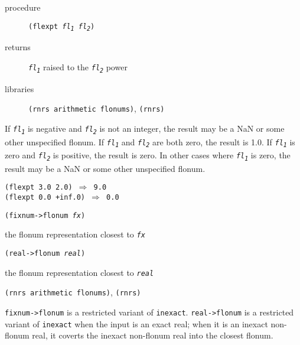 \begin{description}

\label{objects_s197}\item[procedure] \texttt{(flexpt \textit{fl\textsubscript{1}} \textit{fl\textsubscript{2}})}



\item[returns] \texttt{\textit{fl\textsubscript{1}}} raised to the \texttt{\textit{fl\textsubscript{2}}} power


\item[libraries] \texttt{(rnrs arithmetic flonums)}, \texttt{(rnrs)}
\end{description}


If \texttt{\textit{fl\textsubscript{1}}} is negative and \texttt{\textit{fl\textsubscript{2}}} is not an integer,
the result may be a NaN or some other unspecified flonum.
If \texttt{\textit{fl\textsubscript{1}}} and \texttt{\textit{fl\textsubscript{2}}} are both zero, the result
is 1.0.  If \texttt{\textit{fl\textsubscript{1}}} is zero and \texttt{\textit{fl\textsubscript{2}}} is positive,
the result is zero.  In other cases where \texttt{\textit{fl\textsubscript{1}}} is
zero, the result may be a NaN or some other unspecified
flonum.


\begin{alltt}
(flexpt 3.0 2.0) \(\Rightarrow\) 9.0
(flexpt 0.0 +inf.0) \(\Rightarrow\) 0.0
\end{alltt}

\begin{description}

\label{objects_s198}\item[procedure] \texttt{(fixnum-\textgreater{}flonum \textit{fx})}



\item[returns] the flonum representation closest to \texttt{\textit{fx}}


\item[procedure] \texttt{(real-\textgreater{}flonum \textit{real})}



\item[returns] the flonum representation closest to \texttt{\textit{real}}


\item[libraries] \texttt{(rnrs arithmetic flonums)}, \texttt{(rnrs)}
\end{description}

\texttt{fixnum-\textgreater{}flonum} is a restricted variant of \texttt{inexact}.
\texttt{real-\textgreater{}flonum} is a restricted variant of \texttt{inexact} when
the input is an exact real; when it is an inexact non-flonum real,
it coverts the inexact non-flonum real into the closest flonum.


